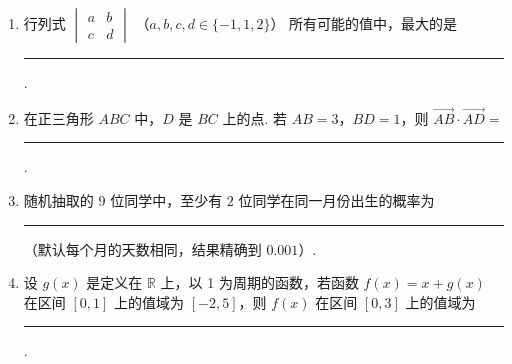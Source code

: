 \begin{description}
\begin{enumerate}[leftmargin=5pt]
        \item 行列式 \(\begin{vmatrix}a & b\\ c & d \end{vmatrix}\) （\(a, b, c, d \in \{-1,1,2\}\)） 所有可能的值中，最大的是\rule[-0.3ex]{3em}{0.4pt}.

        \item 在正三角形 \(ABC\) 中，\(D\) 是 \(BC\) 上的点. 若 \(AB = 3\)，\(BD = 1\)，则 \(\overrightarrow{AB} \cdot \overrightarrow{AD} =\)\rule[-0.3ex]{3em}{0.4pt}.

        \item 随机抽取的 \(9\) 位同学中，至少有 \(2\) 位同学在同一月份出生的概率为\rule[-0.3ex]{3em}{0.4pt}（默认每个月的天数相同，结果精确到 \(0.001\)）.

        \item 设 \(g(x)\) 是定义在 \(\mathbb{R}\) 上，以 1 为周期的函数，若函数 \(f(x) = x + g(x)\) 在区间 \([0,1]\) 上的值域为 \([-2,5]\)，则 \(f(x)\) 在区间 \([0,3]\) 上的值域为\rule[-0.3ex]{3em}{0.4pt}.

    \end{enumerate}

\end{description}

